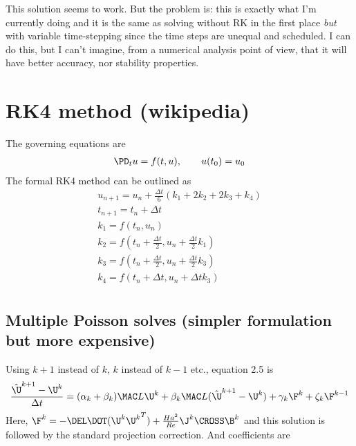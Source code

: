 \documentclass[11pt]{article}
\begin{document}
\normalsize
This solution seems to work. But the problem is: this is exactly what I'm currently doing and it is the same as solving without RK in the first place \textit{but} with variable time-stepping since the time steps are unequal and scheduled. I can do this, but I can't imagine, from a numerical analysis point of view, that it will have better accuracy, nor stability properties.

\newpage

\section{RK4 method (wikipedia)}
The governing equations are
\begin{equation}\begin{aligned}
  \PD_t u = f(t,u), \qquad u(t_0) = u_0 \\
\end{aligned}\end{equation}
The formal RK4 method can be outlined as
\begin{equation}\begin{aligned}
  u_{n+1} = u_n + \frac{\Delta t}{6} (k_1 + 2 k_2 + 2k_3 + k_4) \\
  t_{n+1} = t_n + \Delta t \\
  k_1 = f(t_n,u_n) \\
  k_2 = f\left(t_n + \frac{\Delta t}{2} , u_n + \frac{\Delta t}{2} k_1 \right) \\
  k_3 = f\left(t_n + \frac{\Delta t}{2} , u_n + \frac{\Delta t}{2} k_3 \right) \\
  k_4 = f\left(t_n + \Delta t , u_n + \Delta t k_3 \right) \\
\end{aligned}\end{equation}

\newpage
\subsection{Multiple Poisson solves (simpler formulation but more expensive)}
Using $k+1$ instead of $k$, $k$ instead of $k-1$ etc., equation 2.5 is
\begin{equation}\begin{aligned}
\frac{\hat{\U}^{k+1}-\U^k}{\Delta t} = (\alpha_k+\beta_k) \MAC L \U^k + \beta_k \MAC L (\hat{\U}^{k+1} - \U^k)  + \gamma_k \F^k + \zeta_k \F^{k-1}  \\
\end{aligned} \end{equation}
Here, $\F^k = - \DEL \DOT (\U^k {\U^k}^T) + \frac{Ha^2}{Re} \J^k \CROSS \B^k$ and this solution is followed by the standard projection correction.
And coefficients are
\end{document}
